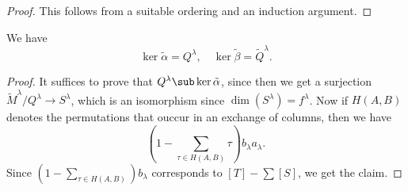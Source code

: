 \begin{proof}
This follows from a suitable ordering and an induction argument.
\end{proof}
\begin{proposition}
We have
\[\ker\tilde{\alpha}=Q^\lambda,\quad \ker\tilde{\beta}=\widetilde{Q}^\lambda.\]
\end{proposition}
\begin{proof}
It suffices to prove that $Q^\lambda\sub\ker\tilde{\alpha}$, since then we get a surjection $\widetilde{M}^\lambda/Q^\lambda\to S^\lambda$, which is an isomorphism since $\dim(S^\lambda)=f^\lambda$. Now if $H(A,B)$ denotes the permutations that ouccur in an exchange of columns, then we have
\[(1-\sum_{\tau\in H(A,B)}\tau)b_\lambda a_\lambda.\]
Since $(1-\sum_{\tau\in H(A,B)})b_\lambda$ corresponds to $[T]-\sum[S]$, we get the claim.
\end{proof}
